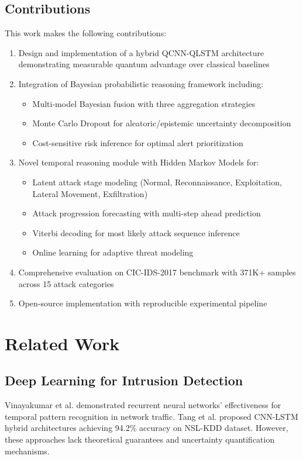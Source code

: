 \documentclass[conference]{IEEEtran}
\begin{document}
\subsection{Contributions}
This work makes the following contributions:
\begin{enumerate}
    \item Design and implementation of a hybrid QCNN-QLSTM architecture demonstrating measurable quantum advantage over classical baselines
    \item Integration of Bayesian probabilistic reasoning framework including:
    \begin{itemize}
        \item Multi-model Bayesian fusion with three aggregation strategies
        \item Monte Carlo Dropout for aleatoric/epistemic uncertainty decomposition
        \item Cost-sensitive risk inference for optimal alert prioritization
    \end{itemize}
    \item Novel temporal reasoning module with Hidden Markov Models for:
    \begin{itemize}
        \item Latent attack stage modeling (Normal, Reconnaissance, Exploitation, Lateral Movement, Exfiltration)
        \item Attack progression forecasting with multi-step ahead prediction
        \item Viterbi decoding for most likely attack sequence inference
        \item Online learning for adaptive threat modeling
    \end{itemize}
    \item Comprehensive evaluation on CIC-IDS-2017 benchmark with 371K+ samples across 15 attack categories
    \item Open-source implementation with reproducible experimental pipeline
\end{enumerate}

\section{Related Work}

\subsection{Deep Learning for Intrusion Detection}
Vinayakumar et al. \cite{ref4} demonstrated recurrent neural networks' effectiveness for temporal pattern recognition in network traffic. Tang et al. \cite{ref5} proposed CNN-LSTM hybrid architectures achieving 94.2\% accuracy on NSL-KDD dataset. However, these approaches lack theoretical guarantees and uncertainty quantification mechanisms.
\end{document}
